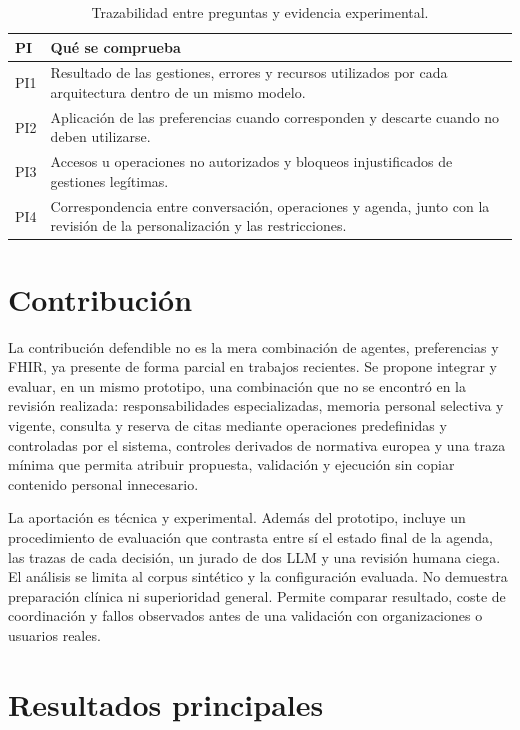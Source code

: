 \begin{table}[H]
\centering
\caption{Trazabilidad entre preguntas y evidencia experimental.}
\label{tab:trazabilidad-preguntas}
\small
\begin{tabularx}{\textwidth}{L{0.09\textwidth}Y}
\toprule
\textbf{PI} & \textbf{Qué se comprueba} \\
\midrule
PI1 & Resultado de las gestiones, errores y recursos utilizados por cada arquitectura dentro de un mismo modelo. \\
PI2 & Aplicación de las preferencias cuando corresponden y descarte cuando no deben utilizarse. \\
PI3 & Accesos u operaciones no autorizados y bloqueos injustificados de gestiones legítimas. \\
PI4 & Correspondencia entre conversación, operaciones y agenda, junto con la revisión de la personalización y las restricciones. \\
\bottomrule
\end{tabularx}
\end{table}

\section{Contribución}

La contribución defendible no es la mera combinación de agentes, preferencias y
FHIR, ya presente de forma parcial en trabajos recientes. Se propone integrar y
evaluar, en un mismo prototipo, una combinación que no se encontró en la
revisión realizada: responsabilidades especializadas, memoria personal
selectiva y vigente, consulta y reserva de citas mediante operaciones
predefinidas y controladas por el sistema,
controles derivados de normativa europea y una traza mínima que permita atribuir
propuesta, validación y ejecución sin copiar contenido personal innecesario.

La aportación es técnica y experimental. Además del prototipo, incluye un
procedimiento de evaluación que contrasta entre sí el estado final de la
agenda, las trazas de cada decisión, un jurado de dos LLM y una revisión humana
ciega. El análisis se limita al corpus
sintético y la configuración evaluada. No demuestra preparación clínica ni
superioridad general. Permite comparar resultado, coste de coordinación y
fallos observados antes de una validación con organizaciones o usuarios reales.

\section{Resultados principales}
\label{sec:intro-resultados}


